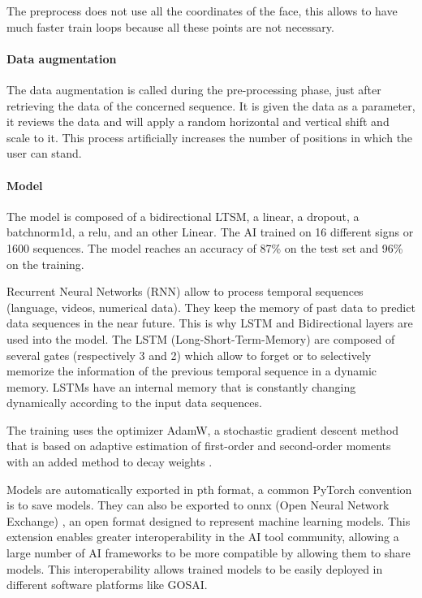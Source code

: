 The preprocess does not use all the coordinates of the face, this allows to have much faster train loops because all these points are not necessary.

\paragraph{Data augmentation}

The data augmentation is called during the pre-processing phase,
just after retrieving the data of the concerned sequence. It is given
the data as a parameter, it reviews the data and will apply a random
horizontal and vertical shift and scale to it. This process artificially
increases the number of positions in which the user can stand.

\paragraph{Model}

The model is composed of a bidirectional LTSM, a linear, a dropout, a batchnorm1d, a relu, and an other Linear. The AI trained on 16 different signs or 1600 sequences. The model reaches an accuracy of 87\% on the test set and 96\% on the training.

Recurrent Neural Networks (RNN) allow to process temporal sequences (language, videos, numerical data). They keep the memory of past data to predict data sequences in the near future. This is why LSTM and Bidirectional layers are used into the model. The LSTM (Long-Short-Term-Memory) are composed of several gates (respectively 3 and 2) which allow to forget or to selectively memorize the information of the previous temporal sequence in a dynamic memory.
LSTMs have an internal memory that is constantly changing dynamically according to the input data sequences.

The training uses the optimizer AdamW, a stochastic gradient descent method that is based on adaptive estimation of first-order and second-order moments with an added method to decay weights \cite{loshchilov2017decoupled}. 

Models are automatically exported in pth format, a common PyTorch convention is to save models. They can also be exported to onnx (Open Neural Network Exchange) \cite{onnx}, an open format designed to represent machine learning models. This extension enables greater interoperability in the AI tool community, allowing a large number of AI frameworks to be more compatible by allowing them to share models. This interoperability allows trained models to be easily deployed in different software platforms like GOSAI.

